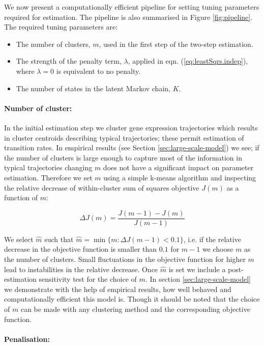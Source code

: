 We now present a computationally efficient pipeline for setting tuning parameters required for estimation. The pipeline is also summarised in Figure \ref{fig:pipeline}. The required tuning parameters are:

\begin{itemize}
\item The number of clusters, $m$, used in the first step of the two-step estimation.
\item The strength of the penalty term, $\lambda$, applied in eqn. (\ref{eq:leastSqrs.indep}), where $\lambda=0$ is equivalent to no penalty.
\item The number of states in the latent Markov chain, $K$.
\end{itemize}

\paragraph{Number of cluster:}
\label{sec:number-cluster}

In the initial estimation step we cluster gene expression trajectories which results in cluster centroids describing typical trajectories; these permit estimation of transition rates. In empirical results (see Section \ref{sec:large-scale-model}) we see; if the number of clusters is large enough to capture most of the information in typical trajectories changing $m$ does not have a significant impact on parameter estimation. Therefore we set $m$ using a simple k-means algorithm and inspecting the relative decrease of within-cluster sum of squares objective $J(m)$ as a function of $m$:

\[
\Delta J(m) = \frac{J(m-1) - J(m)}{J(m - 1)}
\]

We select $\hat{m}$  such that $\hat{m} = \min \lbrace m : \Delta J(m-1) < 0.1 \rbrace$, i.e. if the relative decrease in the objective function is smaller than $0.1$ for $m-1$ we choose $m$ as the number of clusters. Small fluctuations in the objective function for higher $m$ lead to instabilities in the relative decrease. Once $\hat{m}$ is set we include a post-estimation sensitivity test for the choice of $m$. In section \ref{sec:large-scale-model} we demonstrate with the help of empirical results, how well behaved and computationally efficient this model is. Though it should be noted that the choice of $m$ can be made with any clustering method and the corresponding objective function.

\paragraph{Penalisation:}
\label{sec:penalization}

